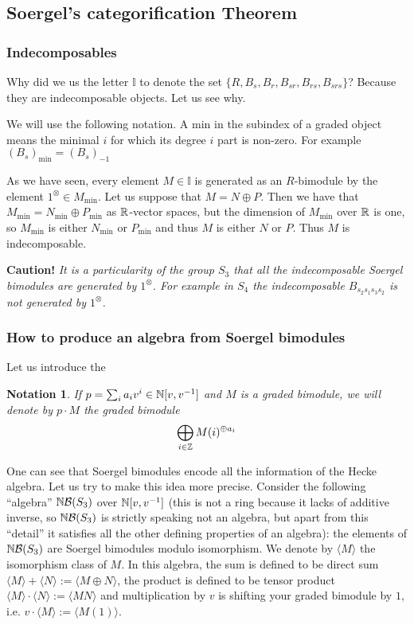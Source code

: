 \documentclass[12pt]{wart}
\newtheorem{nota}[thm]{Notation}
\theoremstyle{remark}
\def\II{\mathbb I}\def\JJ{\mathbb J}\def\KK{\mathbb K}\def\LL{\mathbb L}
\begin{document}
\subsection{Soergel's categorification Theorem}

\subsubsection{Indecomposables}
Why did we us the letter $\II$ to denote the set $\{R, B_s, B_r, B_{sr}, B_{rs}, B_{srs}\}$? Because they are indecomposable objects. Let us see why.  


We will use the following notation. A $\mathrm{min}$ in the subindex of a graded object means the minimal $i$ for which its degree $i$ part is non-zero. For example $(B_s)_{\mathrm{min}}=(B_s)_{-1}$


As we have seen, every  element $M\in \II$ is generated as an $R$-bimodule by the element $1^{\otimes}\in M_{\mathrm{min}}$. Let us suppose that $M=N\oplus P$.  Then we have that $M_{\mathrm{min}}=N_{\mathrm{min}}\oplus P_{\mathrm{min}}$ as $\mathbb R$-vector spaces, but the dimension of $M_{\mathrm{min}}$ over $\mathbb R$ is one, so $M_{\mathrm{min}}$ is either $N_{\mathrm{min}}$ or $P_{\mathrm{min}}$ and thus $M$ is either $N$ or $P$. Thus $M$ is indecomposable. 

\textbf{Caution!}  \emph{It is a particularity of the  group $S_3$ that all the indecomposable Soergel bimodules are generated  by $1^{\otimes}$. For example in $S_4$ the indecomposable $B_{s_2s_1s_3s_2}$ is not generated by $1^{\otimes}$. }

\subsubsection{How to produce an algebra from Soergel bimodules}

Let us introduce the 
\begin{nota}\label{poly}
If $p=\sum_i a_i v^i \in \mathbb N[v,v^{-1}]$ and $M$ is a graded bimodule,  we will denote by $p\cdot M$ the graded bimodule $$\bigoplus_{i\in \mathbb Z}M(i)^{\oplus a_i}$$
\end{nota}

One can see that Soergel bimodules encode all the information of the Hecke algebra. Let us try to make this idea more precise. Consider the following ``algebra'' $\mathbb N\mathcal B(S_3)$ over $ \mathbb N[v,v^{-1}]$ (this is not a ring because it lacks of additive inverse, so $\mathbb N\mathcal B(S_3)$ is strictly speaking not an algebra, but apart from this ``detail'' it satisfies all the other defining properties of an algebra): the elements of $\mathbb N\mathcal B(S_3)$ are Soergel bimodules modulo isomorphism. We denote by $\langle M\rangle$ the isomorphism class of $M$. In this algebra, the sum is defined to be direct sum $\langle M\rangle+\langle N\rangle:=\langle M\oplus N\rangle$, the product is defined to be tensor product $\langle M\rangle \cdot \langle N\rangle:=\langle M N\rangle$ and multiplication by $v$ is shifting your graded bimodule by $1$, i.e. $v\cdot \langle M\rangle:= \langle M(1)\rangle$. 
\end{document}
